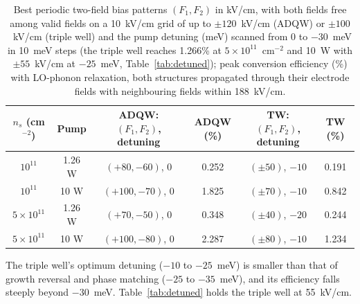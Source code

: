 \documentclass[11pt]{article}
\begin{document}
\begin{table}[t]
\centering\small
\caption{Best periodic two-field bias patterns $(F_1,F_2)$ in kV/cm, with both fields free among valid fields on a 10~kV/cm grid of up to $\pm120$~kV/cm (ADQW) or $\pm100$~kV/cm (triple well) and the pump detuning (meV) scanned from 0 to $-30$~meV in 10~meV steps (the triple well reaches 1.266\% at $5\times10^{11}$~cm$^{-2}$ and 10~W with $\pm55$~kV/cm at $-25$~meV, Table~\ref{tab:detuned}); peak conversion efficiency (\%) with LO-phonon relaxation, both structures propagated through their electrode fields with neighbouring fields within 188~kV/cm.}\label{tab:opt}
\setlength{\tabcolsep}{4pt}
\begin{tabular}{@{}cccccc@{}}
\toprule
$n_s$ (cm$^{-2}$) & Pump & ADQW: $(F_1,F_2)$, detuning & ADQW (\%) & TW: $(F_1,F_2)$, detuning & TW (\%) \\ \midrule
$10^{11}$ & 1.26 W & $(+80,-60)$, 0 & 0.252 & $(\pm50)$, $-10$ & 0.191 \\
$10^{11}$ & 10 W & $(+100,-70)$, 0 & 1.825 & $(\pm70)$, $-10$ & 0.842 \\
$5\times10^{11}$ & 1.26 W & $(+70,-50)$, 0 & 0.348 & $(\pm40)$, $-20$ & 0.244 \\
$5\times10^{11}$ & 10 W & $(+100,-80)$, 0 & 2.287 & $(\pm80)$, $-10$ & 1.234 \\ \bottomrule
\end{tabular}
\end{table}
The triple well's optimum detuning ($-10$ to $-25$~meV) is smaller than that of growth reversal and phase matching ($-25$ to $-35$~meV), and its efficiency falls steeply beyond $-30$~meV. Table~\ref{tab:detuned} holds the triple well at 55~kV/cm.
\end{document}
